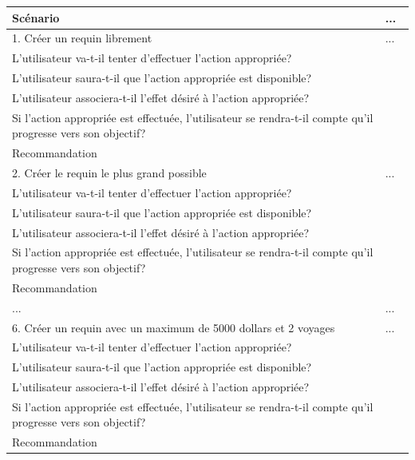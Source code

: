 \documentclass{article}
\begin{document}
\begin{table}[h]
	\centering
	\begin{tabular}{|p{6cm}|p{1.5cm}|}
		\hline
		\textbf{Scénario} & \textbf{...} \\ \hline
		1. Créer un requin librement & ... \\ \hline
		\multicolumn{2}{|p{7.5cm}|}{L’utilisateur va-t-il tenter d’effectuer l’action appropriée?} \\ \hline
		\multicolumn{2}{|p{7.5cm}|}{L’utilisateur saura-t-il que l’action appropriée est disponible?} \\ \hline
		\multicolumn{2}{|p{7.5cm}|}{L’utilisateur associera-t-il l’effet désiré à l’action appropriée?} \\ \hline
		\multicolumn{2}{|p{7.5cm}|}{Si l’action appropriée est effectuée, l’utilisateur se rendra-t-il compte qu’il progresse vers son objectif?} \\ \hline
		\multicolumn{2}{|p{7.5cm}|}{Recommandation} \\ \hline
		2. Créer le requin le plus grand possible & ... \\ \hline
		\multicolumn{2}{|p{7.5cm}|}{L’utilisateur va-t-il tenter d’effectuer l’action appropriée?} \\ \hline
		\multicolumn{2}{|p{7.5cm}|}{L’utilisateur saura-t-il que l’action appropriée est disponible?} \\ \hline
		\multicolumn{2}{|p{7.5cm}|}{L’utilisateur associera-t-il l’effet désiré à l’action appropriée?} \\ \hline
		\multicolumn{2}{|p{7.5cm}|}{Si l’action appropriée est effectuée, l’utilisateur se rendra-t-il compte qu’il progresse vers son objectif?} \\ \hline
		\multicolumn{2}{|p{7.5cm}|}{Recommandation} \\ \hline
		... & ... \\ \hline
		6. Créer un requin avec un maximum de 5000 dollars et 2 voyages & ... \\ \hline
		\multicolumn{2}{|p{7.5cm}|}{L’utilisateur va-t-il tenter d’effectuer l’action appropriée?} \\ \hline
		\multicolumn{2}{|p{7.5cm}|}{L’utilisateur saura-t-il que l’action appropriée est disponible?} \\ \hline
		\multicolumn{2}{|p{7.5cm}|}{L’utilisateur associera-t-il l’effet désiré à l’action appropriée?} \\ \hline
		\multicolumn{2}{|p{7.5cm}|}{Si l’action appropriée est effectuée, l’utilisateur se rendra-t-il compte qu’il progresse vers son objectif?} \\ \hline
		\multicolumn{2}{|p{7.5cm}|}{Recommandation} \\ \hline
	\end{tabular}
\end{table}
\end{document}
